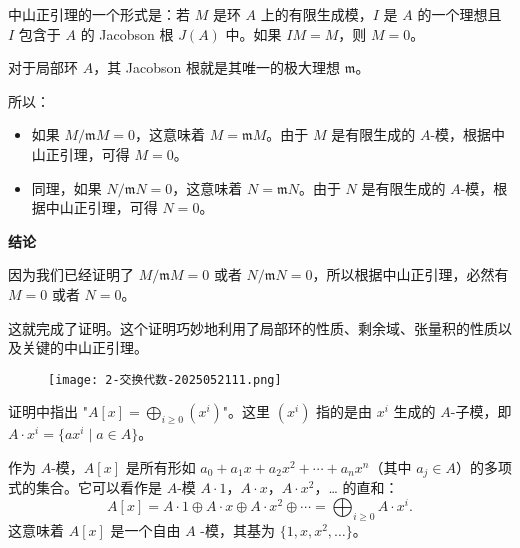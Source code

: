中山正引理的一个形式是：若 $M$ 是环 $A$ 上的有限生成模，$I$ 是 $A$ 的一个理想且 $I$ 包含于 $A$ 的 Jacobson 根 $J(A)$ 中。如果 $IM=M$，则 $M=0$。

对于局部环 $A$，其 Jacobson 根就是其唯一的极大理想 $\mathfrak{m}$。

所以：

\begin{itemize}
	\item 如果 $M/\mathfrak{m}M = 0$，这意味着 $M = \mathfrak{m}M$。由于 $M$ 是有限生成的 $A$-模，根据中山正引理，可得 $M=0$。
	\item 同理，如果 $N/\mathfrak{m}N = 0$，这意味着 $N = \mathfrak{m}N$。由于 $N$ 是有限生成的 $A$-模，根据中山正引理，可得 $N=0$。
\end{itemize}

\textbf{结论}

因为我们已经证明了 $M/\mathfrak{m}M = 0$ 或者 $N/\mathfrak{m}N = 0$，所以根据中山正引理，必然有 $M=0$ 或者 $N=0$。

这就完成了证明。这个证明巧妙地利用了局部环的性质、剩余域、张量积的性质以及关键的中山正引理。

\begin{exercise}
\begin{figure}[H]
\centering
\texttt{[image: 2-交换代数-2025052111.png]}
\label{}
\end{figure}
\end{exercise}
证明中指出 "$A[x] = \bigoplus_{i \geq 0} (x^i)$"。这里 $(x^i)$ 指的是由 $x^i$ 生成的 $A$-子模，即 $A \cdot x^i = \{ax^i \mid a \in A\}$。

作为 $A$-模，$A[x]$ 是所有形如 $a_0 + a_1x + a_2x^2 + \cdots + a_nx^n$（其中 $a_j \in A$）的多项式的集合。它可以看作是 $A$-模 $A \cdot 1$，$A \cdot x$，$A \cdot x^2$，… 的直和：
\[
A[x] = A \cdot 1 \oplus A \cdot x \oplus A \cdot x^2 \oplus \cdots = \bigoplus_{i \geq 0} A \cdot x^i.
\]
这意味着 $A[x]$ 是一个自由 $A$ -模，其基为 $\{1, x, x^2, \ldots\}$。
